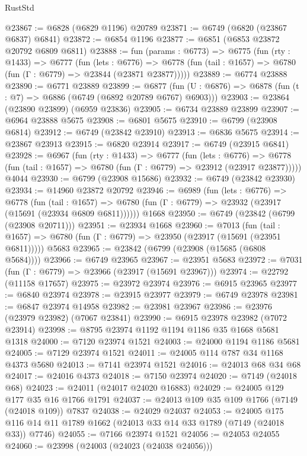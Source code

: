 \begin{lexlean}{RustStd}
\begin{coremodule}
@23867 := @6828 (@6829 @1196) @20789
@23871 := @6749 (@6820 (@23867 @6837) @6841)
@23872 := @6854 @1196
@23877 := @6851 (@6853 @23872 @20792 @6809 @6811)
@23888 := fun (params : @6773) =>
  @6775
    (fun (rty : @1433) =>
    @6777
      (fun (lets : @6776) =>
      @6778 (fun (tail : @1657) => @6780 (fun (Γ : @6779) => @23844 (@23871 @23877)))))
@23889 := @6774 @23888
@23890 := @6771 @23889
@23899 := @6877
    (fun (U : @6876) => @6878 (fun (t : @7) => @6886 (@6749 (@6892 @20789 @6767) @6903)))
@23903 := @23864 (@23890 @23899) (@6959 @23836)
@23905 := @6734 @23889 @23899
@23907 := @6964 @23888 @5675
@23908 := @6801 @5675
@23910 := @6799 (@23908 @6814)
@23912 := @6749 (@23842 @23910)
@23913 := @6836 @5675
@23914 := @23867 @23913
@23915 := @6820 @23914
@23917 := @6749 (@23915 @6841)
@23928 := @6967
    (fun (rty : @1433) =>
    @6777
      (fun (lets : @6776) =>
      @6778 (fun (tail : @1657) => @6780 (fun (Γ : @6779) => @23912 (@23917 @23877)))))
    @4044
@23930 := @6799 (@23908 @15686)
@23932 := @6749 (@23842 @23930)
@23934 := @14960 @23872 @20792
@23946 := @6989
    (fun (lets : @6776) =>
    @6778
      (fun (tail : @1657) =>
      @6780 (fun (Γ : @6779) => @23932 (@23917 (@15691 (@23934 @6809 @6811))))))
    @1668
@23950 := @6749 (@23842 (@6799 (@23908 @20711)))
@23951 := @23934 @1668
@23960 := @7013
    (fun (tail : @1657) => @6780 (fun (Γ : @6779) => @23950 (@23917 (@15691 (@23951 @6811)))))
    @5683
@23965 := @23842 (@6799 (@23908 (@15685 (@6808 @5684))))
@23966 := @6749 @23965
@23967 := @23951 @5683
@23972 := @7031 (fun (Γ : @6779) => @23966 (@23917 (@15691 @23967)))
@23974 := @22792 (@11158 @17657)
@23975 := @23972 @23974
@23976 := @6915 @23965
@23977 := @6840 @23974
@23978 := @23915 @23977
@23979 := @6749 @23978
@23981 := @6847 @23974 @14958
@23982 := @23981 @23967
@23986 := @23976 (@23979 @23982) (@7067 @23841)
@23990 := @6915 @23978 @23982 (@7072 @23914)
@23998 := @8795 @23974 @1192 @1194 @1186 @35 @1668 @5681 @1318
@24000 := @7120 @23974 @1521
@24003 := @24000 @1194 @1186 @5681
@24005 := @7129 @23974 @1521
@24011 := @24005 @114 @787 @34 @1168 @4373 @5680
@24013 := @7141 @23974 @1521
@24016 := @24013 @68 @34 @68
@24017 := @24016 @4373
@24018 := @7150 @23974
@24020 := @7149 (@24018 @68)
@24023 := @24011 (@24017 @24020 @16883)
@24029 := @24005 @129 @177 @35 @16 @1766 @1791
@24037 := @24013 @109 @35 @109 @1766 (@7149 (@24018 @109)) @7837
@24038 := @24029 @24037
@24053 := @24005 @175 @116 @14 @11 @1789 @1662 (@24013 @33 @14 @33 @1789 (@7149 (@24018 @33)) @7746)
@24055 := @7166 @23974 @1521
@24056 := @24053 @24055
@24060 := @23998 (@24003 (@24023 (@24038 @24056)))

\end{coremodule}
\end{lexlean}
